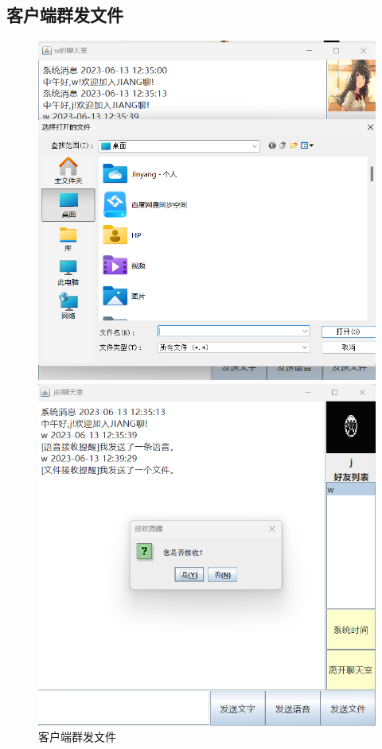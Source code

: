\documentclass[UTF8,12pt]{article}
\begin{document}
\newpage

\subsection{客户端群发文件}
\begin{figure}[htbp]
    \centering
    \begin{minipage}{0.4\textwidth}
        \centering
        \includegraphics[width=1.0\textwidth]{img/19.png}
    \end{minipage}
    \begin{minipage}{0.4\textwidth}
        \centering
        \includegraphics[width=1.0\textwidth]{img/20.png}
    \end{minipage}
    \caption{客户端群发文件}
\end{figure}
\end{document}
